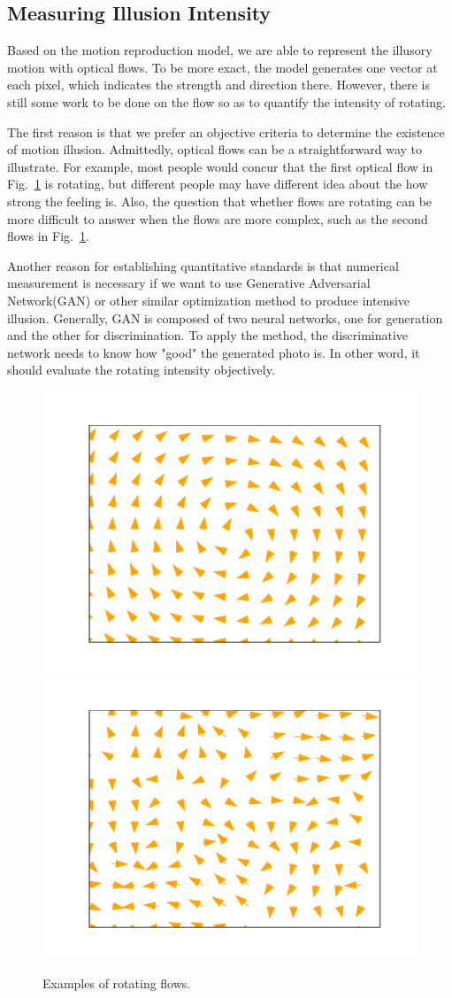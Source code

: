\documentclass[journal]{IEEEtran}
\begin{document}
  
  \subsection{Measuring Illusion Intensity}
  \label{sec:detection_measure}
  
  Based on the motion reproduction model, we are able to represent the illusory motion with optical flows. To be more exact, the model generates one vector at each pixel, which indicates the strength and direction there. However, there is still some work to be done on the flow so as to quantify the intensity of rotating. 
  
  The first reason is that we prefer an objective criteria to determine the existence of motion illusion. Admittedly, optical flows can be a straightforward way to illustrate. For example, most people would concur that the first optical flow in Fig.~\ref{fig:standard_rotating_flows} is rotating, but different people may have different idea about the how strong the feeling is. Also, the question that whether flows are rotating can be more difficult to answer when the flows are more complex, such as the second flows in Fig.~\ref{fig:standard_rotating_flows}.
  
  Another reason for establishing quantitative standards is that numerical measurement is necessary if we want to use Generative Adversarial Network(GAN) or other similar optimization method to produce intensive illusion. Generally, GAN is composed of two neural networks, one for generation and the other for discrimination. To apply the method, the discriminative network needs to know how "good" the generated photo is. In other word, it should evaluate the rotating intensity objectively.
  
  \begin{figure}[t]
    \centering
    \includegraphics[width=0.4\linewidth,height=0.4\linewidth]{fig/standard_rotating.pdf}
      \includegraphics[width=0.4\linewidth, height=0.4\linewidth]{fig/non_standard_rotating.pdf}
    \caption{Examples of rotating flows.}
    \label{fig:standard_rotating_flows}
  \end{figure}
  
\end{document}
